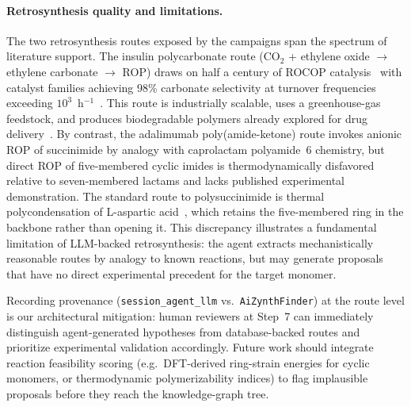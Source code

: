 \documentclass[twocolumn]{fairmeta}
\begin{document}
\paragraph{Retrosynthesis quality and limitations.}
The two retrosynthesis routes exposed by the campaigns span the spectrum of literature support.
The insulin polycarbonate route (CO$_2$ + ethylene oxide $\to$ ethylene carbonate $\to$ ROP) draws on half a century of ROCOP catalysis~\cite{paul2015rocop} with catalyst families achieving 98\% carbonate selectivity at turnover frequencies exceeding $10^3$~h$^{-1}$~\cite{williams2025coiii}.
This route is industrially scalable, uses a greenhouse-gas feedstock, and produces biodegradable polymers already explored for drug delivery~\cite{ganivada2016polycarbonate,arno2022polycarbonate}.
By contrast, the adalimumab poly(amide-ketone) route invokes anionic ROP of succinimide by analogy with caprolactam polyamide~6 chemistry, but direct ROP of five-membered cyclic imides is thermodynamically disfavored relative to seven-membered lactams and lacks published experimental demonstration.
The standard route to polysuccinimide is thermal polycondensation of L-aspartic acid~\cite{neuse2008polyaspartamides}, which retains the five-membered ring in the backbone rather than opening it.
This discrepancy illustrates a fundamental limitation of LLM-backed retrosynthesis: the agent extracts mechanistically reasonable routes by analogy to known reactions, but may generate proposals that have no direct experimental precedent for the target monomer.

Recording provenance (\texttt{session\_agent\_llm} vs.\ \texttt{AiZynthFinder}) at the route level is our architectural mitigation: human reviewers at Step~7 can immediately distinguish agent-generated hypotheses from database-backed routes and prioritize experimental validation accordingly.
Future work should integrate reaction feasibility scoring (e.g.\ DFT-derived ring-strain energies for cyclic monomers, or thermodynamic polymerizability indices) to flag implausible proposals before they reach the knowledge-graph tree.
\end{document}
